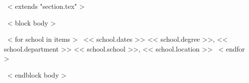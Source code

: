~< extends "section.tex" >~

~< block body >~
\begin{entrylistThree}
~< for school in items >~
\entryThree
{<< school.dates >>}
{<< school.degree >>, << school.department >>}
{<< school.school >>, << school.location >>}
~< endfor >~
\end{entrylistThree}
~< endblock body >~
